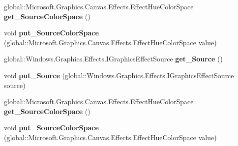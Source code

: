 \begin{DoxyCompactItemize}
\item 
\mbox{\label{interface_microsoft_1_1_graphics_1_1_canvas_1_1_effects_1_1_i_hue_to_rgb_effect_a8962ee09b8e43d2cfb870b6a526a9c3e}} 
global\+::\+Microsoft.\+Graphics.\+Canvas.\+Effects.\+Effect\+Hue\+Color\+Space {\bfseries get\+\_\+\+Source\+Color\+Space} ()
\item 
\mbox{\label{interface_microsoft_1_1_graphics_1_1_canvas_1_1_effects_1_1_i_hue_to_rgb_effect_a2764dc581ffb4eb37255a16155b58807}} 
void {\bfseries put\+\_\+\+Source\+Color\+Space} (global\+::\+Microsoft.\+Graphics.\+Canvas.\+Effects.\+Effect\+Hue\+Color\+Space value)
\item 
\mbox{\label{interface_microsoft_1_1_graphics_1_1_canvas_1_1_effects_1_1_i_hue_to_rgb_effect_a0d8641879596727e5f250feac4374dd2}} 
global\+::\+Windows.\+Graphics.\+Effects.\+I\+Graphics\+Effect\+Source {\bfseries get\+\_\+\+Source} ()
\item 
\mbox{\label{interface_microsoft_1_1_graphics_1_1_canvas_1_1_effects_1_1_i_hue_to_rgb_effect_a10be0ca9703e99422fcc7c71468e80e3}} 
void {\bfseries put\+\_\+\+Source} (global\+::\+Windows.\+Graphics.\+Effects.\+I\+Graphics\+Effect\+Source source)
\item 
\mbox{\label{interface_microsoft_1_1_graphics_1_1_canvas_1_1_effects_1_1_i_hue_to_rgb_effect_a8962ee09b8e43d2cfb870b6a526a9c3e}} 
global\+::\+Microsoft.\+Graphics.\+Canvas.\+Effects.\+Effect\+Hue\+Color\+Space {\bfseries get\+\_\+\+Source\+Color\+Space} ()
\item 
\mbox{\label{interface_microsoft_1_1_graphics_1_1_canvas_1_1_effects_1_1_i_hue_to_rgb_effect_a2764dc581ffb4eb37255a16155b58807}} 
void {\bfseries put\+\_\+\+Source\+Color\+Space} (global\+::\+Microsoft.\+Graphics.\+Canvas.\+Effects.\+Effect\+Hue\+Color\+Space value)
\item 

\end{DoxyCompactItemize}
